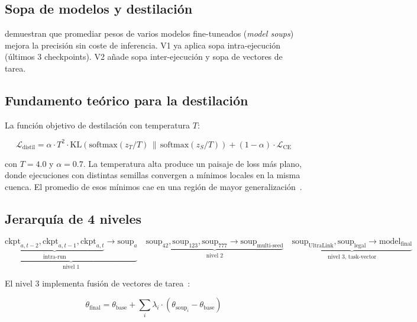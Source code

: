 \documentclass[11pt,a4paper]{article}
\begin{document}
\subsection{Sopa de modelos y destilación}

\citet{wortsman2022model} demuestran que promediar pesos de varios modelos
fine-tuneados (\textit{model soups}) mejora la precisión sin coste de inferencia.
V1 ya aplica sopa intra-ejecución (últimos 3 checkpoints). V2 añade sopa inter-ejecución
y sopa de vectores de tarea.

\subsection{Fundamento teórico para la destilación}

La función objetivo de destilación con temperatura $T$:

\begin{equation}
  \mathcal{L}_{\text{distil}} = \alpha \cdot T^2 \cdot \text{KL}\!\left(
    \text{softmax}(z_T / T) \,\|\, \text{softmax}(z_S / T)
  \right) + (1 - \alpha) \cdot \mathcal{L}_{\text{CE}}
\end{equation}

con $T=4.0$ y $\alpha=0.7$. La temperatura alta produce un paisaje de loss más plano,
donde ejecuciones con distintas semillas convergen a mínimos locales en la misma cuenca.
El promedio de esos mínimos cae en una región de mayor generalización~\citep{wortsman2022model}.

\subsection{Jerarquía de 4 niveles}

\begin{equation}
\underbrace{
  \underbrace{
    \text{ckpt}_{a,t-2}, \text{ckpt}_{a,t-1}, \text{ckpt}_{a,t}
  }_{\text{intra-run}} \!\!\!\!\to \text{soup}_{a}
}_{\text{nivel 1}} \quad
\underbrace{
  \text{soup}_{42}, \text{soup}_{123}, \text{soup}_{777} \to \text{soup}_{\text{multi-seed}}
}_{\text{nivel 2}} \quad
\underbrace{
  \text{soup}_{\text{UltraLink}}, \text{soup}_{\text{legal}} \to \text{model}_{\text{final}}
}_{\text{nivel 3, task-vector}}
\end{equation}

El nivel 3 implementa fusión de vectores de tarea~\citep{ilharco2023editing}:

\begin{equation}
  \theta_{\text{final}} = \theta_{\text{base}} + \sum_i \lambda_i \cdot (\theta_{\text{soup}_i} - \theta_{\text{base}})
\end{equation}
\end{document}
